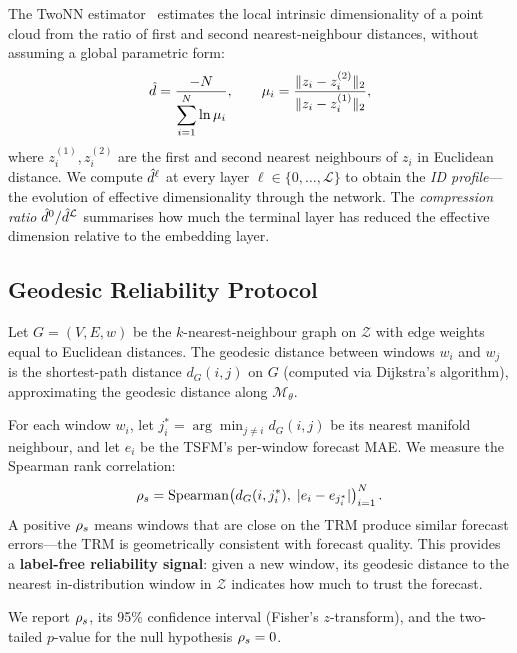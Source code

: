 The TwoNN estimator~\cite{facco2017estimating} estimates the local intrinsic
dimensionality of a point cloud from the ratio of first and second nearest-neighbour
distances, without assuming a global parametric form:
\begin{equation}
  \hat{d} = \frac{-N}{\displaystyle\sum_{i=1}^{N} \ln \mu_i},
  \qquad
  \mu_i = \frac{\|z_i - z_i^{(2)}\|_2}{\|z_i - z_i^{(1)}\|_2},
  \label{eq:twonn}
\end{equation}
where $z_i^{(1)}, z_i^{(2)}$ are the first and second nearest neighbours of
$z_i$ in Euclidean distance.
We compute $\hat{d}^\ell$ at every layer $\ell \in \{0,\ldots,\mathcal{L}\}$
to obtain the \emph{ID profile}---the evolution of effective dimensionality
through the network.
The \emph{compression ratio} $\hat{d}^0 / \hat{d}^{\mathcal{L}}$ summarises how much
the terminal layer has reduced the effective dimension relative to the embedding
layer.

\subsection{Geodesic Reliability Protocol}
\label{sec:geodesic_method}

Let $G = (V, E, w)$ be the $k$-nearest-neighbour graph on
$\mathcal{Z}$ with edge weights equal to Euclidean distances.
The geodesic distance between windows $w_i$ and $w_j$ is the shortest-path
distance $d_G(i,j)$ on $G$ (computed via Dijkstra's algorithm), approximating
the geodesic distance along $\mathcal{M}_\theta$.

For each window $w_i$, let $j_i^* = \arg\min_{j \neq i} d_G(i,j)$ be its
nearest manifold neighbour, and let $e_i$ be the TSFM's per-window forecast MAE.
We measure the Spearman rank correlation:
\begin{equation}
  \rho_{s} = \mathrm{Spearman}\!\left(
    d_G(i, j_i^*),\; |e_i - e_{j_i^*}|
  \right)_{i=1}^N.
  \label{eq:geodesic_corr}
\end{equation}
A positive $\rho_{s}$ means windows that are close on the TRM produce similar
forecast errors---the TRM is geometrically consistent with forecast quality.
This provides a \textbf{label-free reliability signal}: given a new window,
its geodesic distance to the nearest in-distribution window in $\mathcal{Z}$
indicates how much to trust the forecast.

We report $\rho_{s}$, its 95\% confidence interval (Fisher's $z$-transform),
and the two-tailed $p$-value for the null hypothesis $\rho_{s} = 0$.

